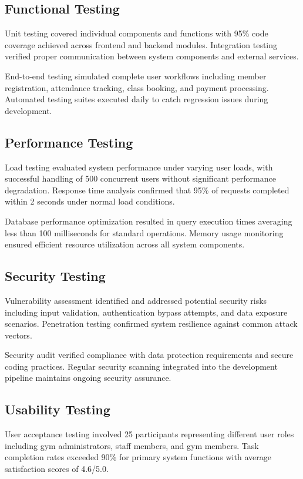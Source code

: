 \documentclass[12pt,a4paper]{report}
\begin{document}
\subsection{Functional Testing}

Unit testing covered individual components and functions with 95\% code coverage achieved across frontend and backend modules. Integration testing verified proper communication between system components and external services.

End-to-end testing simulated complete user workflows including member registration, attendance tracking, class booking, and payment processing. Automated testing suites executed daily to catch regression issues during development.

\subsection{Performance Testing}

Load testing evaluated system performance under varying user loads, with successful handling of 500 concurrent users without significant performance degradation. Response time analysis confirmed that 95\% of requests completed within 2 seconds under normal load conditions.

Database performance optimization resulted in query execution times averaging less than 100 milliseconds for standard operations. Memory usage monitoring ensured efficient resource utilization across all system components.

\subsection{Security Testing}

Vulnerability assessment identified and addressed potential security risks including input validation, authentication bypass attempts, and data exposure scenarios. Penetration testing confirmed system resilience against common attack vectors.

Security audit verified compliance with data protection requirements and secure coding practices. Regular security scanning integrated into the development pipeline maintains ongoing security assurance.

\subsection{Usability Testing}

User acceptance testing involved 25 participants representing different user roles including gym administrators, staff members, and gym members. Task completion rates exceeded 90\% for primary system functions with average satisfaction scores of 4.6/5.0.
\end{document}
